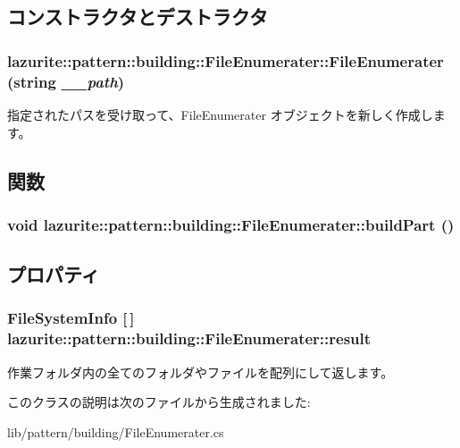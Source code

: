 \subsection{コンストラクタとデストラクタ}
\hypertarget{classlazurite_1_1pattern_1_1building_1_1_file_enumerater_a0d646d88f01d88edb4754a1fedda9e54}{
\subsubsection[{FileEnumerater}]{\setlength{\rightskip}{0pt plus 5cm}lazurite::pattern::building::FileEnumerater::FileEnumerater (string {\em \_\-\_\-path})}}
\label{classlazurite_1_1pattern_1_1building_1_1_file_enumerater_a0d646d88f01d88edb4754a1fedda9e54}
指定されたパスを受け取って、FileEnumerater オブジェクトを新しく作成します。 

\subsection{関数}
\hypertarget{classlazurite_1_1pattern_1_1building_1_1_file_enumerater_a6a61e899e3e32b1e3a46be161ce2f4c7}{
\subsubsection[{buildPart}]{\setlength{\rightskip}{0pt plus 5cm}void lazurite::pattern::building::FileEnumerater::buildPart ()}}
\label{classlazurite_1_1pattern_1_1building_1_1_file_enumerater_a6a61e899e3e32b1e3a46be161ce2f4c7}


\subsection{プロパティ}
\hypertarget{classlazurite_1_1pattern_1_1building_1_1_file_enumerater_af944c11a4a5d20be87f757d8cdef5688}{
\subsubsection[{result}]{\setlength{\rightskip}{0pt plus 5cm}FileSystemInfo \mbox{[}$\,$\mbox{]} lazurite::pattern::building::FileEnumerater::result}}
\label{classlazurite_1_1pattern_1_1building_1_1_file_enumerater_af944c11a4a5d20be87f757d8cdef5688}


作業フォルダ内の全てのフォルダやファイルを配列にして返します。 

このクラスの説明は次のファイルから生成されました:\begin{DoxyCompactItemize}
\item 
lib/pattern/building/FileEnumerater.cs\end{DoxyCompactItemize}
